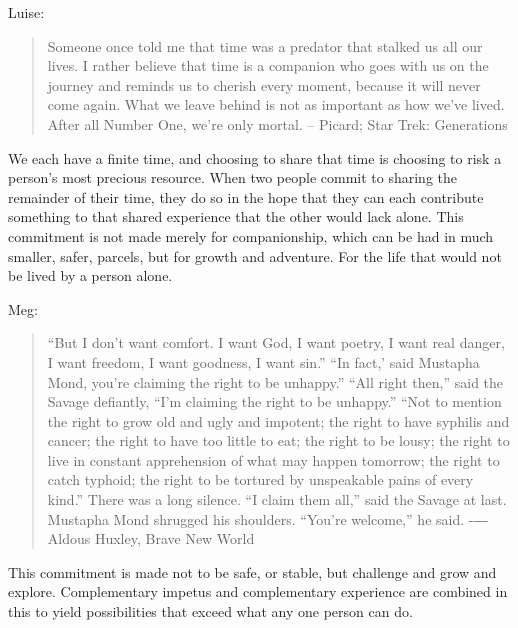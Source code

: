 \documentclass[twoside]{article}
\begin{document}
        \begin{center}
          Luise:
        \end{center}
        \begin{quote}
          Someone once told me that time was a predator that stalked us all our lives. I rather believe that time is a companion who goes with us on the journey and reminds us to cherish every moment, because it will never come again. What we leave behind is not as important as how we've lived. After all Number One, we're only mortal. 
          -- Picard; Star Trek: Generations
        \end{quote}
        
We each have a finite time, and choosing to share that time is choosing to risk a person’s most precious resource. When two people commit to sharing the remainder of their time, they do so in the hope that they can each contribute something to that shared experience that the other would lack alone. This commitment is not made merely for companionship, which can be had in much smaller, safer, parcels, but for growth and adventure. For the life that would not be lived by a person alone. 

        \begin{center}
          Meg:
        \end{center}
        \begin{quote}
          ``But I don't want comfort. I want God, I want poetry, I want real danger, I want freedom, I want goodness, I want sin.''
          ``In fact,' said Mustapha Mond, you're claiming the right to be unhappy.''
          ``All right then,'' said the Savage defiantly, ``I'm claiming the right to be unhappy.'' 
          ``Not to mention the right to grow old and ugly and impotent; the right to have syphilis and cancer; the right to have too little to eat; the right to be lousy; the right to live in constant apprehension of what may happen tomorrow; the right to catch typhoid; the right to be tortured by unspeakable pains of every kind.'' 
          There was a long silence. ``I claim them all,'' said the Savage at last.
          Mustapha Mond shrugged his shoulders. ``You're welcome,'' he said.
          -― Aldous Huxley, Brave New World
        \end{quote}
        
This commitment is made not to be safe, or stable, but challenge and grow and explore. Complementary impetus and complementary experience are combined in this to yield possibilities that exceed what any one person can do. 
 
\end{document}
